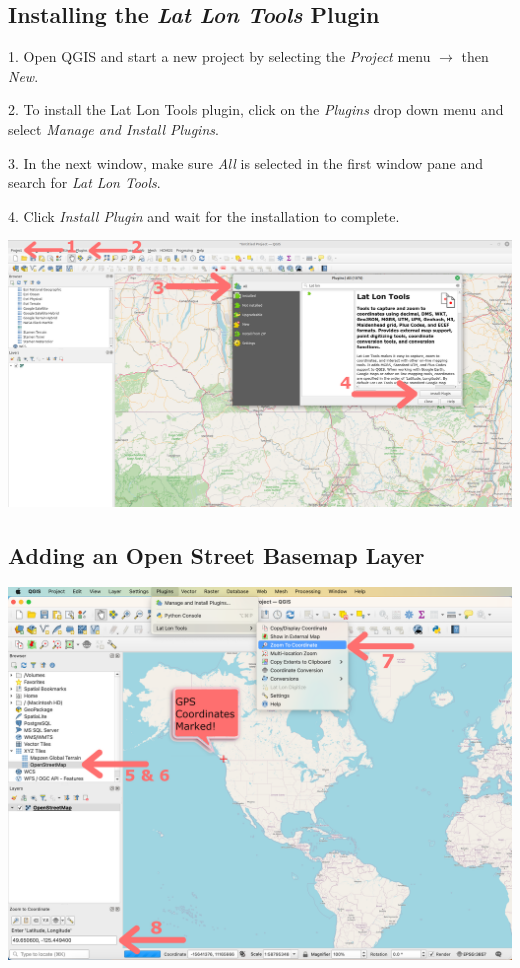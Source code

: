 \documentclass[oneside,a4paper,11pt,explicit]{book}
\begin{document}
	\subsection{Installing the \textit{Lat Lon Tools} Plugin}
	
	1. Open QGIS and start a new project by selecting the \textit{Project} menu $\rightarrow$ then \textit{New}. 
	
	2. To install the Lat Lon Tools plugin, click on the \textit{Plugins} drop down menu and select \textit{Manage and Install Plugins}.
	
	3. In the next window, make sure \textit{All} is selected in the first window pane and search for \textit{Lat Lon Tools}.
	
	4. Click \textit{Install Plugin} and wait for the installation to complete.
	
	\centerline{\includegraphics[width=\textwidth]{LatLonTools.png}}
	
	\subsection{Adding an Open Street Basemap Layer}
	
	\centerline{\includegraphics[width=.9\textwidth]{QGISbasemap.png}}
	
\end{document}
